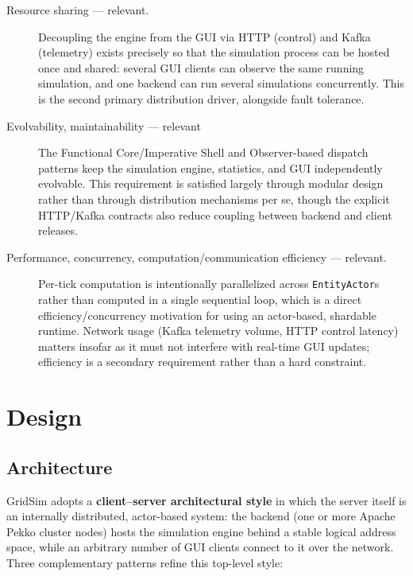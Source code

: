 \documentclass{scrreprt}
\begin{document}
\begin{description}
  \item[Resource sharing --- relevant.]
  Decoupling the engine from the GUI via HTTP (control) and Kafka
  (telemetry)
  exists precisely so that the simulation process
  can
  be hosted once and shared: several GUI clients can observe the same
  running
  simulation, and one backend can run several simulations concurrently. This
  is the second primary distribution driver, alongside fault tolerance.

  \item[Evolvability, maintainability --- relevant]
  The Functional Core/Imperative Shell and Observer-based dispatch patterns
  keep the simulation engine, statistics, and GUI independently evolvable.
  This requirement is satisfied largely through modular design rather than
  through distribution mechanisms per se, though the explicit HTTP/Kafka
  contracts also reduce coupling between backend and client releases.

  \item[Performance, concurrency, computation/communication efficiency ---
    relevant.]
  Per-tick computation is intentionally parallelized across
  \texttt{EntityActor}s rather than computed in a single sequential loop,
  which is a direct efficiency/concurrency motivation for using an
  actor-based, shardable runtime. Network usage (Kafka telemetry volume,
  HTTP
  control latency) matters insofar as it must not interfere with real-time
  GUI updates; efficiency is a secondary
  requirement rather than a hard constraint.

\end{description}

\section{Design}\label{design}


\subsection{Architecture}\label{architecture}

GridSim adopts a \textbf{client--server architectural style} in which the server itself is an
internally distributed, actor-based system: the backend (one or more Apache Pekko cluster
nodes) hosts the simulation engine behind a stable logical address space, while an arbitrary
number of GUI clients connect to it over the network. Three complementary patterns refine this
top-level style:
\end{document}
